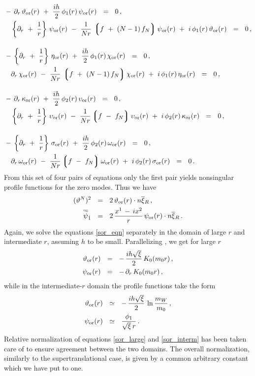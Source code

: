 \documentclass[12pt]{article}
\newcommand{\p}{\partial}
\newcommand{\wt}{\widetilde}
\newcommand{\ov}{\overline}
\newcommand{\lgr}{\left\lgroup}
\newcommand{\rgr}{\right\rgroup}
\newcommand{\bxir}{\ov{\xi}{}_R}
\newcommand{\tor}{\vartheta_{\rm or}}
\newcommand{\eor}{\eta_{\rm or}}
\newcommand{\kor}{\kappa_{\rm or}}
\newcommand{\sor}{\sigma_{\rm or}}
\newcommand{\por}{\psi_{\rm or}}
\newcommand{\cor}{\chi_{\rm or}}
\newcommand{\uor}{\upsilon_{\rm or}}
\newcommand{\oor}{\omega_{\rm or}}
\begin{document}
\begin{align}
\label{sor_eqn}
%
\notag
	&
	-\, \p_r\, \tor(r) ~+~ \frac{ih}{2}\, \phi_1(r)\,\por(r) ~~=~~ 0\,,  \\
\notag
	&
	\phantom{-\,}
	\left\{ \p_r ~+~ \frac{1}{r} \right\}\, \por(r)  
			~-~ \frac{1}{Nr}\, \lgr f ~+~ (N-1)\,f_N \rgr \por(r) 
			~+~ i\,\phi_1(r)\,\tor(r) ~~=~~ 0   \,,              \\[4mm]
%
\notag
	& 
	-\, \left\{ \p_r ~+~ \frac{1}{r} \right\}\, \eor(r) 
			~+~ \frac{ih}{2}\, \phi_1(r)\,\cor(r) ~~=~~ 0\,, \\
	&
	\phantom{-\,}
	\p_r\, \cor(r) ~-~ \frac{1}{Nr}\, \lgr f ~+~ (N-1)\,f_N \rgr \cor(r) 
			~+~ i\, \phi_1(r)\, \eor(r) ~~=~~ 0 \,,\\[4mm]
%
\notag
	&
	-\, \p_r\, \kor(r) ~+~ \frac{ih}{2}\, \phi_2(r)\, \uor(r) ~~=~~ 0\,, \\
\notag
	&
	\phantom{-\,}
	\left\{ \p_r ~+~ \frac{1}{r} \right\}\, \uor(r) 
			~-~ \frac{1}{Nr} \lgr f ~-~ f_N \rgr \uor(r) 
			~+~ i\,\phi_2(r)\, \kor(r) ~~=~~ 0 \,,\\[4mm]
%
\notag
	&
	-\, \left\{ \p_r ~+~ \frac{1}{r} \right\}\, \sor(r) 
			~+~ \frac{ih}{2}\, \phi_2(r)\,\oor(r) ~~=~~ 0 \,,\\
\notag
	&
	\phantom{-\,}
	\p_r\, \oor(r) ~-~ \frac{1}{Nr}\lgr f ~-~ f_N \rgr \oor(r) 
			~+~ i\,\phi_2(r)\,\sor(r) ~~=~~ 0\,.
\end{align}
From this set of four pairs of equations only the first pair yields nonsingular profile functions
for the zero modes.
Thus we have
\begin{align}
%
\notag
	(\vartheta^N)^2  & ~~=~~ 2\,\tor(r)\cdot n\bxir \,,\\
%
\label{or_anz}
	\ov{\wt{\psi}}{}_{\dot 1} & ~~=~~ 2\, \frac{x^1\,-\,ix^2}{r}\, \por(r)\cdot n\bxir \,.
\end{align}
Again, we solve the equations \eqref{sor_eqn} separately in the domain of large $ r $ and 
intermediate $ r $, assuming $ h $ to be small.
Parallelizing  \cite{GSYmmodel,BSYhet}, we get for large $ r $
\begin{align}
\label{sor_large}
%
\notag
	\tor(r) & ~~=~~ -\, \frac{ih\sqrt{\xi}}{2}\, K_0(m_0 r) \,,\\
%
	\por(r) & ~~=~~ -\, \p_r\, K_0(m_0 r) \,,
\end{align}
while in the intermediate-$r$ domain the profile functions take the form
\begin{align}
\label{sor_interm}
%
\notag
	\tor(r) & ~~\simeq~~ -\, \frac{ih\sqrt{\xi}}{2}\, \ln \frac{m_W}{m_0} \,,\\
%
	\por(r) & ~~\simeq~~ \frac{\phi_1}{\sqrt{\xi}\, r}\,.
\end{align}
Relative normalization of equations \eqref{sor_large} and \eqref{sor_interm} has been taken care of
to ensure agreement between the two domains. 
The overall normalization, similarly to the supertranslational case, is given by a common 
arbitrary constant which we have put to one.
\end{document}
